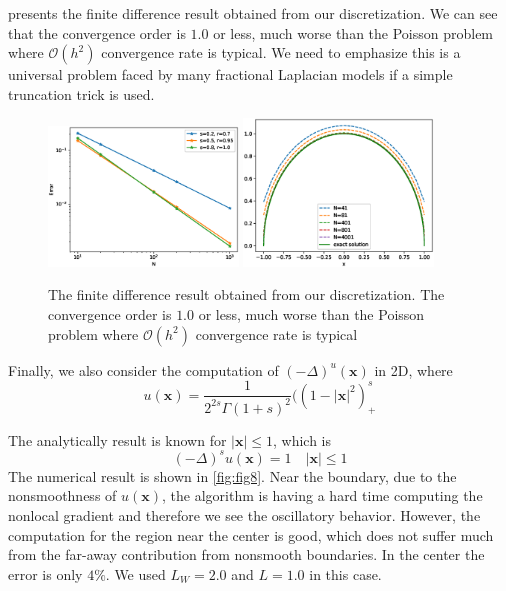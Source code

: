 \documentclass[10pt,a4paper]{article}
\newcommand{\bx}[0]{\mathbf{x}}
\theoremstyle{definition}
\begin{document}
 presents the finite difference result obtained from our discretization. We can see that the convergence order is $1.0$ or less, much worse than the Poisson problem where $\mathcal{O}(h^2)$ convergence rate is typical. We need to emphasize this is a universal problem faced by many fractional Laplacian models if a simple truncation trick is used. 

\begin{figure}[H] %
\centering
\includegraphics[width=0.45\textwidth,keepaspectratio]{figures/fig6}
\includegraphics[width=0.45\textwidth,keepaspectratio]{figures/fig7}
\caption{The finite difference result obtained from our discretization. The convergence order is $1.0$ or less, much worse than the Poisson problem where $\mathcal{O}(h^2)$ convergence rate is typical}
\label{fig:fig6}
\end{figure}

Finally, we also consider the computation of $(-\Delta)^ u(\bx)$ in 2D, where
\begin{equation}
	u(\bx) = \frac{1}{2^{2s}\Gamma(1+s)^2} ((1-|\bx|^2)^s_+
\end{equation}

The analytically result is known for $|\bx|\leq 1$, which is
\begin{equation}\label{equ:u1}
	(-\Delta)^s u(\bx) = 1\quad |\bx|\leq 1
\end{equation}
The numerical result is shown in \cref{fig:fig8}. Near the boundary, due to the nonsmoothness of $u(\bx)$, the algorithm is having a hard time computing the nonlocal gradient and therefore we see the oscillatory behavior. However, the computation for the region near the center is  good, which does not suffer much from the far-away contribution from nonsmooth boundaries. In the center the error is only $4\%$. We used $L_W=2.0$ and $L=1.0$ in this case.  
\end{document}
